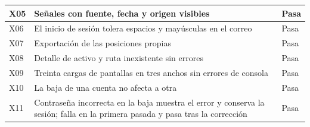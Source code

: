 \begin{longtable}{>{\raggedright\arraybackslash}p{}>{\raggedright\arraybackslash}p{}p{}}
X05 & Señales con fuente, fecha y origen visibles & Pasa \\\hline
X06 & El inicio de sesión tolera espacios y mayúsculas en el correo & Pasa \\\hline
X07 & Exportación de las posiciones propias & Pasa \\\hline
X08 & Detalle de activo y ruta inexistente sin errores & Pasa \\\hline
X09 & Treinta cargas de pantallas en tres anchos sin errores de consola & Pasa \\\hline
X10 & La baja de una cuenta no afecta a otra & Pasa \\\hline
X11 & Contraseña incorrecta en la baja muestra el error y conserva la sesión; falla en la primera pasada y pasa tras la corrección & Pasa \\\hline
\end{longtable}

